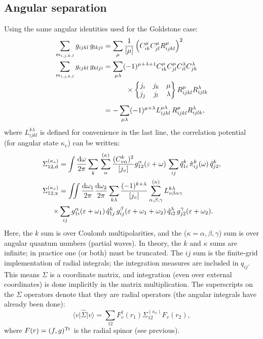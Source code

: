 \documentclass[10pt,twocolumn,a4paper]{article}%
\newcommand{\bra}[1]{\ensuremath{\langle #1|}}	%
\newcommand{\ket}[1]{\ensuremath{|#1\rangle}}	%
\newcommand{\sixj}[6]{\ensuremath{\begin{Bmatrix}#1&#2&#3\\#4&#5&#6\end{Bmatrix}}}	%
\def\d{\ensuremath{{\rm d}}}
\def\en{\ensuremath{\varepsilon}}
\renewcommand{\a}{\ensuremath{\alpha}}
\renewcommand{\b}{\ensuremath{\beta}}
\newcommand{\g}{\ensuremath{\gamma}}
\renewcommand{\k}{\ensuremath{\kappa}}
\newcommand{\w}{\ensuremath{\omega}}
\begin{document}
\subsection{Angular separation}


Using the same angular identities used for the Goldstone case:
\begin{align}
\sum_{m_{i,j,k,l}}  g_{ijkl} \, g_{lkji}
    &= \sum_\mu \frac{1}{[\mu]} \left( C^\mu_{ik}C^\mu_{jl} R^\mu_{ijkl}\right)^2 \\
\sum_{m_{i,j,k,l}}  g_{ijkl} \, g_{klji}
        &=\sum_{\mu \lambda}(-1)^{\mu+\lambda+1}C^\mu_{ik}C^\mu_{jl}C^\lambda_{il}C^\lambda_{jk} \notag \\
    &\phantom{=\sum_{\mu \lambda}}~~\times \sixj{j_i}{j_k}{\mu}{j_j}{j_l}{\lambda}R^\mu_{ijkl}R^\lambda_{ijlk}\\
            &=-\sum_{\mu \lambda}(-1)^{\mu+\lambda}L^{\mu\lambda}_{ijkl} \, R^\mu_{ijkl}R^\lambda_{ijlk},
\end{align}
where $L^{k\lambda}_{ijkl}$ is defined for convenience in the last line,
the correlation potential (for angular state $\k_v$) can be written:
\begin{align}
\Sigma^{(\k_v)}_{12,{\rm d}}
&= \int\frac{\d \w}{2\pi} \sum_k\,\sum_{\alpha}^{(\kappa)} \frac{ (C^k_{v\a})^2}{[j_v]}
g^{\alpha}_{12}(\en+\w) \, \sum_{ij} \hat q^k_{1i} \, \hat \pi_{ij}^{k}(\w) \, \hat q^k_{j2},
\label{eq:RadialSigmaDir}
\\
\Sigma^{(\k_v)}_{12,{\rm x}}
&= \iint\frac{\d\w_1}{2\pi} \frac{\d\w_2}{2\pi} \sum_{k\lambda}\frac{(-1)^{k+\lambda}}{[j_v]}
\sum^{(\k)}_{\a,\b,\g}
L_{v\b\a\g}^{k\lambda}
\notag\\
\times&\sum_{ij}  g^\a_{1i}(\en+\w_1)\,\hat q^k_{1j}\,g^\b_{ij}(\en+\w_1+\w_2)\,\hat q^\lambda_{i2}\,g^\g_{j2}(\en+\w_2).
\label{eq:RadialSigmaExch}
\end{align}
Here, the $k$ sum is over Coulomb multipolarities, and the ($\k=\a,\b,\g$) sum is over angular quantum numbers (partial waves).
In theory, the $k$ and $\kappa$ sums are infinite; in practice one (or both) must be truncated.
The $ij$ sum is the finite-grid implementation of radial integrals; the integration measures are included in $q_{ij}$.
This means $\Sigma$ is a coordinate matrix, and integration (even over external coordinates) is done implicitly in the matrix multiplication.
The superscripts on the $\Sigma$ operators denote that they are radial operators (the angular integrals have already been done):
\[
\bra{v}\hat\Sigma\ket{v} = \sum_{12}F^\dag_v(r_1)\Sigma^{(\k_v)}_{12}F_v(r_2),
\]
where $F(r)=(f,g)^{\rm Tr}$ is the radial spinor (see previous).
\end{document}
